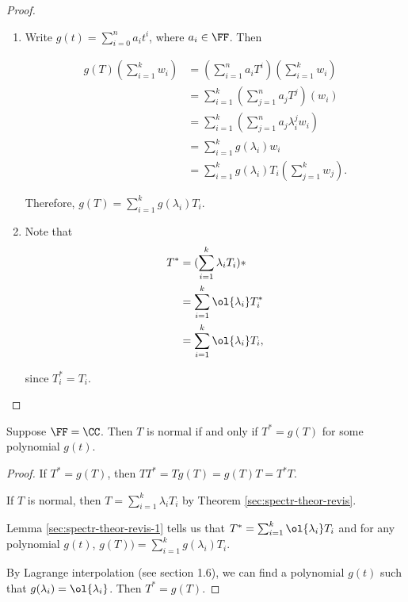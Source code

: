 \documentclass[11pt]{scrartcl}
\begin{document}
\begin{proof}
  \hfill

  \begin{enumerate}[label=\alph*)]
  \item Write $g(t) = \sum_{i=0}^na_{i}t^{i}$, where $a_i\in \FF$. Then

    \begin{align}
      g(T)(\sum_{i=1}^kw_i) & = (\sum_{i=1}^na_iT^i)(\sum_{i=1}^kw_i)           \\
                            & = \sum_{i=1}^k(\sum_{j=1}^na_jT^j)(w_i)           \\
                            & = \sum_{i=1}^k(\sum_{j=1}^na_j\lambda_i^{j}w_{i}) \\
                            & = \sum_{i=1}^k g(\lambda_i)w_i                    \\
                            & = \sum_{i=1}^kg(\lambda_i)T_i(\sum_{j=1}^kw_j).
    \end{align}

    Therefore, $g(T) = \sum_{i=1}^kg(\lambda_i)T_i$.
  \item Note that
    \begin{align}
      T^{*} & = (\sum_{i=1}^k \lambda_iT_i)*      \\
            & = \sum_{i=1}^k\ol{\lambda_i}T_i^{*} \\
            & = \sum_{i=1}^k \ol{\lambda_i}T_i,
    \end{align}

    since $T_i^{*} = T_{i}$.
  \end{enumerate}
\end{proof}
\begin{corollary}
  \label{sec:spectr-theor-revis-2}
  Suppose $\FF = \CC$. Then $T$ is normal if and only if $T^{*} = g(T)$ for some polynomial $g(t)$.
\end{corollary}

\begin{proof}
    \hfill

    If $T^{*} = g(T)$, then $TT^{*} = T g(T) = g(T)T = T^{*}T$.

    If $T$ is normal, then $T = \sum_{i=1}^k\lambda_{i}T_i$ by Theorem \ref{sec:spectr-theor-revis}.

    Lemma \ref{sec:spectr-theor-revis-1} tells us that
    $T^{*}= \sum_{i=1}^k\ol{\lambda_i}T_{i}$ and for any polynomial
    $g(t)$, $g(T)) = \sum_{i=1}^kg(\lambda_i)T_i$.

    By Lagrange interpolation (see section 1.6), we can find a
    polynomial $g(t)$ such that $g(\lambda_i) = \ol{\lambda_i}$. Then
    $T^{*}=g(T)$.

  \end{proof}
\end{document}
